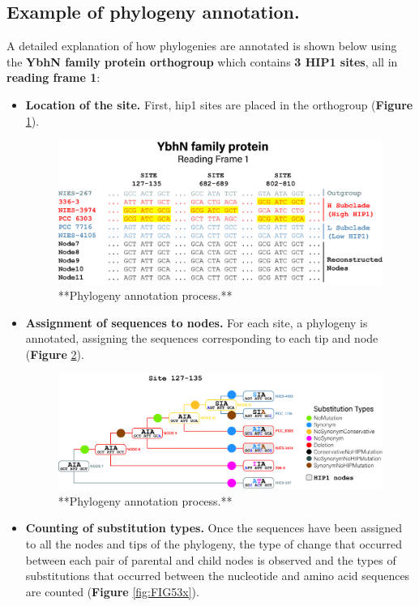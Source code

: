 \documentclass[
]{book}
\providecommand{\tightlist}{%
  \setlength{\itemsep}{0pt}\setlength{\parskip}{0pt}}
\begin{document}
\hypertarget{example-of-phylogeny-annotation.}{%
\subsection{Example of phylogeny annotation.}\label{example-of-phylogeny-annotation.}}

A detailed explanation of how phylogenies are annotated is shown below using the \textbf{YbhN family protein orthogroup} which contains \textbf{3 HIP1 sites}, all in \textbf{reading frame 1}:

\begin{itemize}
\tightlist
\item
  \textbf{Location of the site.} First, hip1 sites are placed in the orthogroup (\textbf{Figure} \ref{fig:FIG51x}).

  \begin{figure}
  \includegraphics[width=1\linewidth]{figures/4x/annotation_1} \caption{**Phylogeny annotation process.**}\label{fig:FIG51x}
  \end{figure}
\item
  \textbf{Assignment of sequences to nodes.} For each site, a phylogeny is annotated, assigning the sequences corresponding to each tip and node (\textbf{Figure} \ref{fig:FIG52x}).

  \begin{figure}
  \includegraphics[width=1\linewidth]{figures/4x/annotation_2A} \caption{**Phylogeny annotation process.**}\label{fig:FIG52x}
  \end{figure}
\item
  \textbf{Counting of substitution types.} Once the sequences have been assigned to all the nodes and tips of the phylogeny, the type of change that occurred between each pair of parental and child nodes is observed and the types of substitutions that occurred between the nucleotide and amino acid sequences are counted (\textbf{Figure} \ref{fig:FIG53x}).


\end{itemize}
\end{document}
